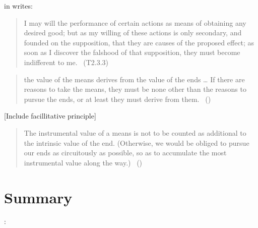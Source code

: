\documentclass[10pt]{article}
\newcommand{\hozlinedash}[0]{%
  \noindent\hdashrule[0.5ex][c]{\textwidth}{.1pt}{2.5pt}
}
\begin{document}


\citeauthor{Hume:2011aa} in  writes:

\begin{quote}
  I may will the performance of certain actions as means of obtaining any desired good; but as my willing of these actions is only secondary, and founded on the supposition, that they are causes of the proposed effect; as soon as I discover the falshood of that supposition, they must become indifferent to me.\nolinebreak
  \mbox{ }\hfill\mbox{\hfill(T2.3.3)}
\end{quote}

\hozlinedash

\begin{quote}
    the value of the means derives from the value of the ends \dots
    If there are reasons to take the means, they must be none other than the reasons to pursue the ends, or at least they must derive from them.\nolinebreak
  \mbox{ }\hfill(\cite[2]{Raz:2005aa})
\end{quote}


\begin{center}
  [Include facillitative principle]
\end{center}

\hozlinedash

\begin{quote}
  The instrumental value of a means is not to be counted as additional to the intrinsic value of the end.
  (Otherwise, we would be obliged to pursue our ends as circuitously as possible, so as to accumulate the most instrumental value along the way.)\nolinebreak
  \mbox{ }\hfill(\cite[65]{Velleman:2000ab})
\end{quote}

\hozlinedash

\newpage

\section{Summary}
\label{sec:summary}


\citeauthor{Broome:2002aa}:
\end{document}
